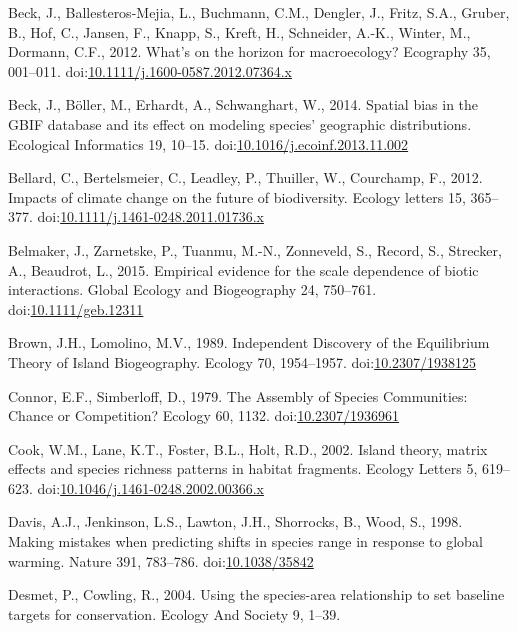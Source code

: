 \hypertarget{ref-Beck2012}{}
Beck, J., Ballesteros-Mejia, L., Buchmann, C.M., Dengler, J., Fritz,
S.A., Gruber, B., Hof, C., Jansen, F., Knapp, S., Kreft, H., Schneider,
A.-K., Winter, M., Dormann, C.F., 2012. What's on the horizon for
macroecology? Ecography 35, 001--011.
doi:\href{https://doi.org/10.1111/j.1600-0587.2012.07364.x}{10.1111/j.1600-0587.2012.07364.x}

\hypertarget{ref-Beck2014a}{}
Beck, J., Böller, M., Erhardt, A., Schwanghart, W., 2014. Spatial bias
in the GBIF database and its effect on modeling species' geographic
distributions. Ecological Informatics 19, 10--15.
doi:\href{https://doi.org/10.1016/j.ecoinf.2013.11.002}{10.1016/j.ecoinf.2013.11.002}

\hypertarget{ref-Bellard2012}{}
Bellard, C., Bertelsmeier, C., Leadley, P., Thuiller, W., Courchamp, F.,
2012. Impacts of climate change on the future of biodiversity. Ecology
letters 15, 365--377.
doi:\href{https://doi.org/10.1111/j.1461-0248.2011.01736.x}{10.1111/j.1461-0248.2011.01736.x}

\hypertarget{ref-Belmaker2015}{}
Belmaker, J., Zarnetske, P., Tuanmu, M.-N., Zonneveld, S., Record, S.,
Strecker, A., Beaudrot, L., 2015. Empirical evidence for the scale
dependence of biotic interactions. Global Ecology and Biogeography 24,
750--761.
doi:\href{https://doi.org/10.1111/geb.12311}{10.1111/geb.12311}

\hypertarget{ref-Brown1989}{}
Brown, J.H., Lomolino, M.V., 1989. Independent Discovery of the
Equilibrium Theory of Island Biogeography. Ecology 70, 1954--1957.
doi:\href{https://doi.org/10.2307/1938125}{10.2307/1938125}

\hypertarget{ref-Connor1979}{}
Connor, E.F., Simberloff, D., 1979. The Assembly of Species Communities:
Chance or Competition? Ecology 60, 1132.
doi:\href{https://doi.org/10.2307/1936961}{10.2307/1936961}

\hypertarget{ref-Cook2002}{}
Cook, W.M., Lane, K.T., Foster, B.L., Holt, R.D., 2002. Island theory,
matrix effects and species richness patterns in habitat fragments.
Ecology Letters 5, 619--623.
doi:\href{https://doi.org/10.1046/j.1461-0248.2002.00366.x}{10.1046/j.1461-0248.2002.00366.x}

\hypertarget{ref-Davis1998}{}
Davis, A.J., Jenkinson, L.S., Lawton, J.H., Shorrocks, B., Wood, S.,
1998. Making mistakes when predicting shifts in species range in
response to global warming. Nature 391, 783--786.
doi:\href{https://doi.org/10.1038/35842}{10.1038/35842}

\hypertarget{ref-Desmet2004}{}
Desmet, P., Cowling, R., 2004. Using the species-area relationship to
set baseline targets for conservation. Ecology And Society 9, 1--39.

